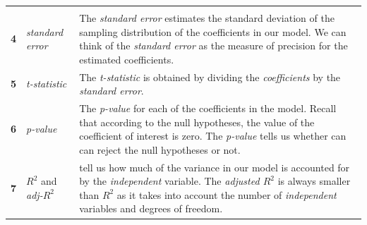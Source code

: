 \documentclass[]{article}
\begin{document}
\begin{longtable}[]{@{}lll@{}}
\begin{minipage}[t]{0.63\columnwidth}
\end{minipage}\tabularnewline
\begin{minipage}[t]{0.07\columnwidth}\raggedright
\textbf{4}\strut
\end{minipage} & \begin{minipage}[t]{0.21\columnwidth}\raggedright
\emph{standard error}\strut
\end{minipage} & \begin{minipage}[t]{0.63\columnwidth}\raggedright
The \emph{standard error} estimates the standard deviation of the sampling distribution of the coefficients in our model. We can think of the \emph{standard error} as the measure of precision for the estimated coefficients.\strut
\end{minipage}\tabularnewline
\begin{minipage}[t]{0.07\columnwidth}\raggedright
\textbf{5}\strut
\end{minipage} & \begin{minipage}[t]{0.21\columnwidth}\raggedright
\emph{t-statistic}\strut
\end{minipage} & \begin{minipage}[t]{0.63\columnwidth}\raggedright
The \emph{t-statistic} is obtained by dividing the \emph{coefficients} by the \emph{standard error}.\strut
\end{minipage}\tabularnewline
\begin{minipage}[t]{0.07\columnwidth}\raggedright
\textbf{6}\strut
\end{minipage} & \begin{minipage}[t]{0.21\columnwidth}\raggedright
\emph{p-value}\strut
\end{minipage} & \begin{minipage}[t]{0.63\columnwidth}\raggedright
The \emph{p-value} for each of the coefficients in the model. Recall that according to the null hypotheses, the value of the coefficient of interest is zero. The \emph{p-value} tells us whether can can reject the null hypotheses or not.\strut
\end{minipage}\tabularnewline
\begin{minipage}[t]{0.07\columnwidth}\raggedright
\textbf{7}\strut
\end{minipage} & \begin{minipage}[t]{0.21\columnwidth}\raggedright
\(R^2\) and \emph{adj-\(R^2\)}\strut
\end{minipage} & \begin{minipage}[t]{0.63\columnwidth}\raggedright
tell us how much of the variance in our model is accounted for by the \emph{independent} variable. The \emph{adjusted \(R^2\)} is always smaller than \emph{\(R^2\)} as it takes into account the number of \emph{independent} variables and degrees of freedom.\strut
\end{minipage}\tabularnewline
\bottomrule
\end{longtable}
\end{document}
